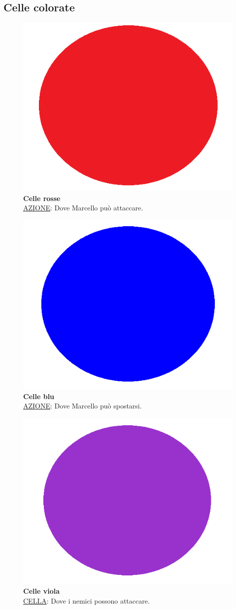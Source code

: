 \documentclass[a4paper,titlepage,12pt]{article}
\begin{document}
\subsection*{Celle colorate}
\begin{itemize}
    \begin{figure}[H]
		\item[\textbf{ }]
		\includegraphics[width=0.05\linewidth]{img/red}
		\label{img:Stick}
		\textbf{Celle rosse}\\
        \underline{AZIONE}: Dove Marcello può attaccare.
    \end{figure}
    
    \begin{figure}[H]
		\item[\textbf{ }]
		\includegraphics[width=0.05\linewidth]{img/blu}
		\label{img:Tube}
		\textbf{Celle blu}\\
        \underline{AZIONE}: Dove Marcello può spostarsi.
    \end{figure}
    
    \begin{figure}[H]
		\item[\textbf{ }]
		\includegraphics[width=0.05\linewidth]{img/purple}
		\label{img:Gun}
		\textbf{Celle viola}\\
        \underline{CELLA}: Dove i nemici possono attaccare.
    \end{figure}
\end{itemize}
\end{document}
